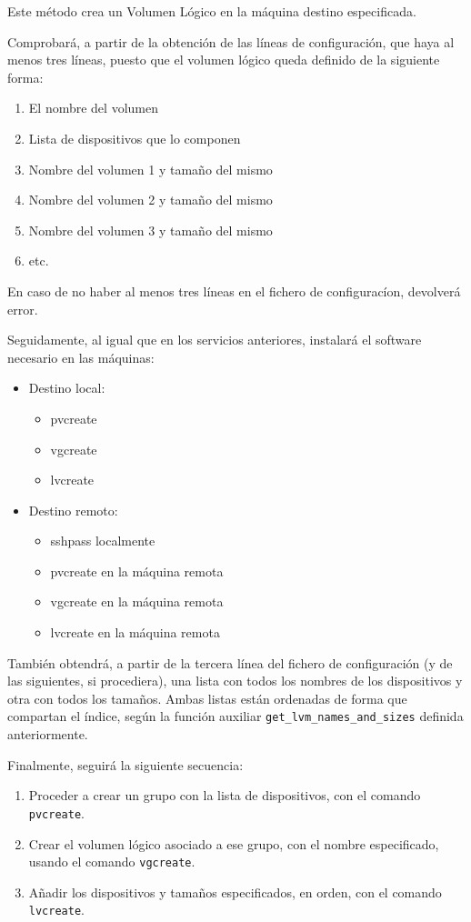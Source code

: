 Este método crea un Volumen Lógico en la máquina destino especificada.

Comprobará, a partir de la obtención de las líneas de configuración, que haya al menos tres líneas, puesto que el volumen lógico queda definido de la siguiente forma:
\begin{enumerate}
    \item El nombre del volumen
    \item Lista de dispositivos que lo componen
    \item Nombre del volumen 1 y tamaño del mismo
    \item Nombre del volumen 2 y tamaño del mismo
    \item Nombre del volumen 3 y tamaño del mismo
    \item etc.
\end{enumerate}
En caso de no haber al menos tres líneas en el fichero de configuracíon, devolverá error.

Seguidamente, al igual que en los servicios anteriores, instalará el software necesario en las máquinas:
\begin{itemize}
    \item Destino local:
    \begin{itemize}
        \item pvcreate 
        \item vgcreate
        \item lvcreate
    \end{itemize}
    \item Destino remoto:
    \begin{itemize}
        \item sshpass localmente
        \item pvcreate en la máquina remota
        \item vgcreate en la máquina remota
        \item lvcreate en la máquina remota
    \end{itemize}
\end{itemize}

También obtendrá, a partir de la tercera línea del fichero de configuración (y de las siguientes, si procediera), una lista con todos los nombres de los dispositivos y otra con todos los tamaños. Ambas listas están ordenadas de forma que compartan el índice, según la función auxiliar \texttt{get\_lvm\_names\_and\_sizes} definida anteriormente.

Finalmente, seguirá la siguiente secuencia:
\begin{enumerate}
    \item Proceder a crear un grupo con la lista de dispositivos, con el comando \texttt{pvcreate}\cite{lvm}. 
    \item Crear el volumen lógico asociado a ese grupo, con el nombre especificado, usando el comando \texttt{vgcreate}\cite{lvm}.
    \item Añadir los dispositivos y tamaños especificados, en orden, con el comando \texttt{lvcreate}\cite{lvm}.
\end{enumerate}